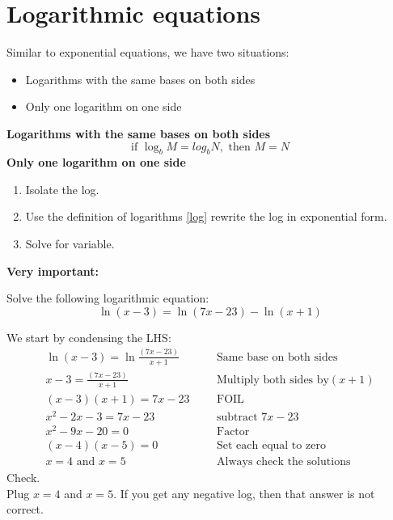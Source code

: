 \section{Logarithmic equations}
Similar to exponential equations, we have two situations:
\begin{itemize}
 \item	Logarithms with the same bases on both sides
 \item	Only one logarithm on one side
\end{itemize}
%
\begin{tcolorbox}[title=Logarithmic equations, 
                  fonttitle=\bfseries,
                  colframe=green!70!black,
                  colback=green!60!white]\textbf{Logarithms with the same bases on both sides}
\[
			\text{if } \log_{b}M=log_{b}N, \text{ then } M=N
					\]
\textbf{Only one logarithm on one side}
 	\begin{enumerate}
 		\item Isolate the log.
 		\item Use the definition of logarithms \eqref{log} rewrite the log in
 			  exponential form.
		\item Solve for variable.
 	\end{enumerate}
\textbf{Very important:}\\
\end{tcolorbox}
\begin{exa}
Solve the following logarithmic equation:
\[
            \ln{(x-3)}=\ln{(7x-23)}-\ln{(x+1)}
\]
\end{exa}
We start by condensing the LHS:
\begin{align*}
		\ln{(x-3)}=\ln{\frac{(7x-23)}{x+1}}&	&&\text{Same base on both sides}\\
		x-3 = \frac{(7x-23)}{x+1}&		&&\text{Multiply both sides by$(x+1)$}\\
		(x-3)(x+1) = 7x-23&			&&\text{FOIL} \\
		x^2-2x-3 =7x-23&			&&\text{subtract $7x-23$}\\
		x^2-9x-20=0&						&&\text{Factor}\\
		(x-4)(x-5)=0&						&&\text{Set each equal to zero}\\
		x=4\,\, \text{and}\,\, x=5&			&&\text{Always check the solutions} 
\end{align*}
Check.\\
Plug $x=4$ and $x=5$. If you get any negative log, then that answer is not correct. 
